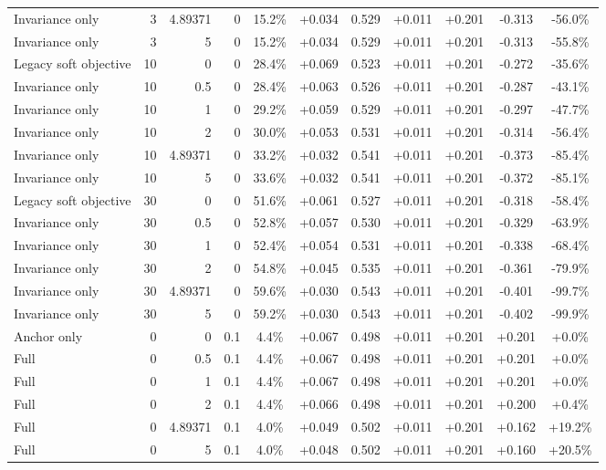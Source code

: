 \begin{table}[htbp]
\begin{tabular}{lrrrccccccc}
Invariance only & 3 & 4.89371 & 0 & 15.2\% & +0.034 & 0.529 & +0.011 & +0.201 & -0.313 & -56.0\% \\
Invariance only & 3 & 5 & 0 & 15.2\% & +0.034 & 0.529 & +0.011 & +0.201 & -0.313 & -55.8\% \\
Legacy soft objective & 10 & 0 & 0 & 28.4\% & +0.069 & 0.523 & +0.011 & +0.201 & -0.272 & -35.6\% \\
Invariance only & 10 & 0.5 & 0 & 28.4\% & +0.063 & 0.526 & +0.011 & +0.201 & -0.287 & -43.1\% \\
Invariance only & 10 & 1 & 0 & 29.2\% & +0.059 & 0.529 & +0.011 & +0.201 & -0.297 & -47.7\% \\
Invariance only & 10 & 2 & 0 & 30.0\% & +0.053 & 0.531 & +0.011 & +0.201 & -0.314 & -56.4\% \\
Invariance only & 10 & 4.89371 & 0 & 33.2\% & +0.032 & 0.541 & +0.011 & +0.201 & -0.373 & -85.4\% \\
Invariance only & 10 & 5 & 0 & 33.6\% & +0.032 & 0.541 & +0.011 & +0.201 & -0.372 & -85.1\% \\
Legacy soft objective & 30 & 0 & 0 & 51.6\% & +0.061 & 0.527 & +0.011 & +0.201 & -0.318 & -58.4\% \\
Invariance only & 30 & 0.5 & 0 & 52.8\% & +0.057 & 0.530 & +0.011 & +0.201 & -0.329 & -63.9\% \\
Invariance only & 30 & 1 & 0 & 52.4\% & +0.054 & 0.531 & +0.011 & +0.201 & -0.338 & -68.4\% \\
Invariance only & 30 & 2 & 0 & 54.8\% & +0.045 & 0.535 & +0.011 & +0.201 & -0.361 & -79.9\% \\
Invariance only & 30 & 4.89371 & 0 & 59.6\% & +0.030 & 0.543 & +0.011 & +0.201 & -0.401 & -99.7\% \\
Invariance only & 30 & 5 & 0 & 59.2\% & +0.030 & 0.543 & +0.011 & +0.201 & -0.402 & -99.9\% \\
Anchor only & 0 & 0 & 0.1 & 4.4\% & +0.067 & 0.498 & +0.011 & +0.201 & +0.201 & +0.0\% \\
Full & 0 & 0.5 & 0.1 & 4.4\% & +0.067 & 0.498 & +0.011 & +0.201 & +0.201 & +0.0\% \\
Full & 0 & 1 & 0.1 & 4.4\% & +0.067 & 0.498 & +0.011 & +0.201 & +0.201 & +0.0\% \\
Full & 0 & 2 & 0.1 & 4.4\% & +0.066 & 0.498 & +0.011 & +0.201 & +0.200 & +0.4\% \\
Full & 0 & 4.89371 & 0.1 & 4.0\% & +0.049 & 0.502 & +0.011 & +0.201 & +0.162 & +19.2\% \\
Full & 0 & 5 & 0.1 & 4.0\% & +0.048 & 0.502 & +0.011 & +0.201 & +0.160 & +20.5\% \\

\end{tabular}
\end{table}
